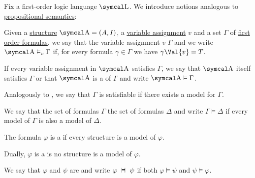 \begin{definition}\label{def:first_order_semantics}
  Fix a first-order logic language \( \CL \). We introduce notions analogous to \hyperref[def:propositional_semantics]{propositional semantics}:
  \begin{DefEnum}
     Given a \hyperref[def:first_order_structure]{structure} \( \CA = (A, I) \), a \hyperref[def:first_order_valuation/variable_assignment]{variable assignment} \( v \) and a set \( \Gamma \) of \hyperref[def:first_order_language/formula]{first order formulas}, we say that the variable assignment \( v \)  \( \Gamma \) and we write \( \CA \vDash_v \Gamma \) if, for every formula \( \gamma \in \Gamma \) we have \( \gamma\Val{v} = T \).

    If every variable assignment in \( \CA \) satisfies \( \Gamma \), we say that \( \CA \) itself satisfies \( \Gamma \) or that \( \CA \) is a  of \( \Gamma \) and write \( \CA \vDash \Gamma \).

    Analogously to , we say that \( \Gamma \) is satisfiable if there exists a model for \( \Gamma \).

     We say that the set of formulas \( \Gamma \)  the set of formulas \( \Delta \) and write \( \Gamma \vDash \Delta \) if every model of \( \Gamma \) is also a model of \( \Delta \).

     The formula \( \varphi \) is a  if every structure is a model of \( \varphi \).

     Dually, \( \varphi \) is a  is no structure is a model of \( \varphi \).

     We say that \( \varphi \) and \( \psi \) are  and write \( \varphi \Sequiv \psi \) if both \( \varphi \vDash \psi \) and \( \psi \vDash \varphi \).
  \end{DefEnum}
\end{definition}

